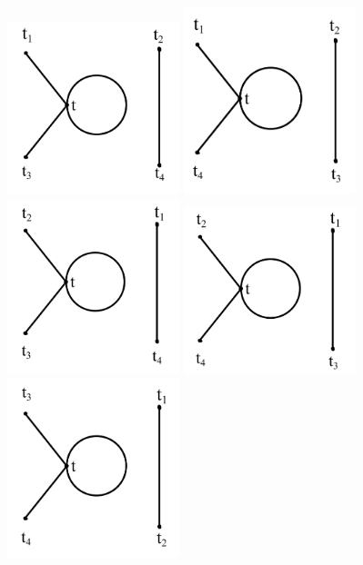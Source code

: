 \begin{center}
    \includegraphics[width=5cm]{sections/IMG_1205.jpeg}
    \includegraphics[width=5cm]{sections/IMG_1206.jpeg}
    \includegraphics[width=5cm]{sections/IMG_1207.jpeg}
    \includegraphics[width=5cm]{sections/IMG_1208.jpeg}
    \includegraphics[width=5cm]{sections/IMG_1209.jpeg}

\end{center}
